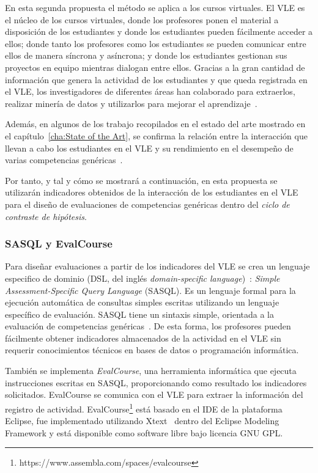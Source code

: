 En esta segunda propuesta el método se aplica a los cursos virtuales. El VLE es el núcleo de los cursos virtuales, donde los profesores ponen el material a disposición de los estudiantes y donde los estudiantes pueden fácilmente acceder a ellos; donde tanto los profesores como los estudiantes se pueden comunicar entre ellos de manera síncrona y asíncrona; y donde los estudiantes gestionan sus proyectos en equipo mientras dialogan entre ellos. Gracias a la gran cantidad de información que genera la actividad de los estudiantes y que queda registrada en el VLE, los investigadores de diferentes áreas han colaborado para extraerlos, realizar minería de datos y utilizarlos para mejorar el aprendizaje~\cite{park2015development}.

Además, en algunos de los trabajo recopilados en el estado del arte mostrado en el capítulo~\ref{cha:State of the Art}, se confirma la relación entre la interacción que llevan a cabo los estudiantes en el VLE y su rendimiento en el desempeño de varias competencias genéricas~\cite{fidalgo:2015,rayon2014web}. 

Por tanto, y tal y cómo se mostrará a continuación, en esta propuesta se utilizarán indicadores obtenidos de la interacción de los estudiantes en el VLE para el diseño de evaluaciones de competencias genéricas dentro del  \emph{ciclo de contraste de hipótesis}.


\subsubsection{SASQL y EvalCourse}

Para diseñar evaluaciones a partir de los indicadores del VLE se crea un lenguaje especifico de dominio (DSL, del inglés \emph{domain-specific language})~\cite{vanDeursen:2000}: \emph{Simple Assessment-Specific Query Language} (SASQL). Es un lenguaje formal para la ejecución automática de consultas simples escritas utilizando un lenguaje específico de evaluación. SASQL tiene un sintaxis simple, orientada a la evaluación de competencias genéricas~\cite{Balderas:2013}. De esta forma, los profesores pueden fácilmente obtener indicadores almacenados de la actividad en el VLE sin requerir conocimientos técnicos en bases de datos o programación informática.

También se implementa \emph{EvalCourse}, una herramienta informática que ejecuta instrucciones escritas en SASQL, proporcionando como resultado los indicadores solicitados. EvalCourse se comunica con el VLE para extraer la información del registro de actividad. EvalCourse\footnote{https://www.assembla.com/spaces/evalcourse} está basado en el IDE de la plataforma Eclipse, fue implementado utilizando Xtext~\cite{eysholdt2010xtext} dentro del Eclipse Modeling Framework y está disponible como software libre bajo licencia GNU GPL.

